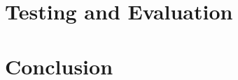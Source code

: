 \documentclass[oribibl]{llncs}
\begin{document}










\newpage
\section{Testing and Evaluation}









\section{Conclusion}







%
\end{document}
